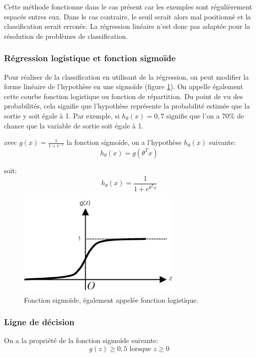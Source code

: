 Cette méthode fonctionne dans le cas présent car les exemples sont régulièrement espacés entres eux. Dans le cas contraire, le seuil serait alors mal positionné et la classification serait erronée. La régression linéaire n'est donc pas adaptée pour la résolution de problèmes de classification. 

\subsubsection{Régression logistique et fonction sigmoïde}
\label{Le Machine Learning: Les différents algorithmes: La regression logistique: Régression logistique et fonction sigmoïde}
Pour réaliser de la classification en utilisant de la régression,  on peut modifier la forme linéaire de l'hypothèse en une sigmoïde (figure \ref{fig:Fonction sigmoïde}). On appelle également cette courbe fonction logistique ou fonction de répartition. Du point de vu des probabilités, cela signifie que l'hypothèse représente la probabilité estimée que la sortie y soit égale à 1. Par exemple, si $h_\theta(x)=0,7$ signifie que l'on a 70\% de chance que la variable de sortie soit égale à 1.  

avec $g(x) = \frac{1}{1 + e^{-z}}$  la fonction sigmoïde, on a l'hypothèse $h_\theta(x)$ suivante: 
\begin{equation}
	h_\theta(x)=g(\theta^Tx) 
\end{equation}

soit: 
\begin{equation}
h_\theta(x)=\frac{1}{1 + e^{\theta^Tx}} 
\end{equation}

\begin{figure}[h]
	\centering\includegraphics[height=5cm]{images/sigmoid.png}
	\caption[Fonction sigmoïde]{Fonction sigmoïde, également appelée fonction logistique.}
	\label{fig:Fonction sigmoïde}
\end{figure}

\subsubsection{Ligne de décision}
\label{Le Machine Learning: Les différents algorithmes: La regression logistique: Ligne de décision}
On a la propriété de la fonction sigmoïde suivante: 
\begin{equation}
 g(z) \ge 0,5 \text{ lorsque } z \ge 0
\end{equation}

